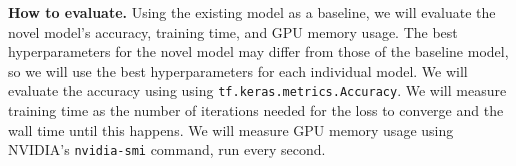 \documentclass[11pt]{article}
\begin{document}
\textbf{How to evaluate.}
Using the existing model as a baseline, we will evaluate the novel model's accuracy, training time, and GPU memory usage. 
The best hyperparameters for the novel model may differ from those of the baseline model, so we will use the best hyperparameters for each individual model.
We will evaluate the accuracy using using \texttt{tf.keras.metrics.Accuracy}. 
We will measure training time as the number of iterations needed for the loss to converge and the wall time until this happens. 
We will measure GPU memory usage using NVIDIA's \texttt{nvidia-smi} command, run every second.


\printbibliography
\end{document}
